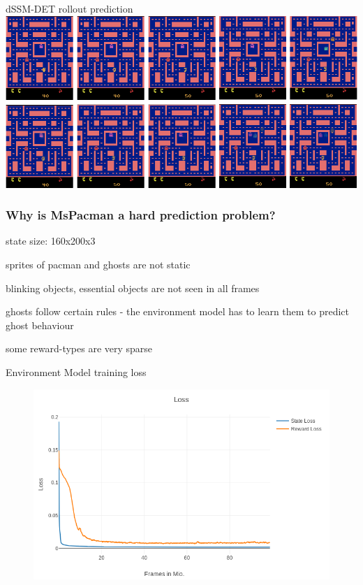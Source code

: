 \begin{frame}{dSSM-DET rollout prediction}
    \includegraphics[width=\textwidth]{./latent_i2a_images/dSSM_rollout_prediction.png}
\end{frame}



\begin{frame}
	\frametitle{Why is MsPacman a hard prediction problem?}
	\begin{PraesentationAufzaehlung}
		\item state size: 160x200x3
		\item sprites of pacman and ghosts are not static
		\item blinking objects, essential objects are not seen in all frames
		\item ghosts follow certain rules - the environment model has to learn them to predict ghost behaviour
		\item some reward-types are very sparse
	\end{PraesentationAufzaehlung}
\end{frame}

    
\begin{frame}{Environment Model training loss}
   \begin{figure}
       \centering
        \includegraphics[width=\textwidth]{./latent_i2a_images/EnvironmentModel_dSSM-DET_training.png}
    \end{figure}
\end{frame}




